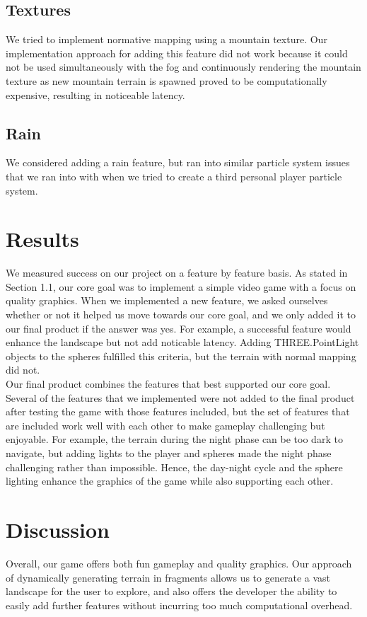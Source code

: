 \documentclass{article}
\begin{document}
\subsection{Textures}
We tried to implement normative mapping using a mountain texture.  Our implementation approach for adding this feature did not work because it could not be used simultaneously with the fog and continuously rendering the mountain texture as new mountain terrain is spawned proved to be computationally expensive, resulting in noticeable latency.

\subsection{Rain}
We considered adding a rain feature, but ran into similar particle system issues that we ran into with when we tried to create a third personal player particle system.

\section{Results}
We measured success on our project on a feature by feature basis.  As stated in Section 1.1, our core goal was to implement a simple video game with a focus on quality graphics.  When we implemented a new feature, we asked ourselves whether or not it helped us move towards our core goal, and we only added it to our final product if the answer was yes.  For example, a successful feature would enhance the landscape but not add noticable latency. Adding THREE.PointLight objects to the spheres fulfilled this criteria, but the terrain with normal mapping did not.\\

Our final product combines the features that best supported our core goal.  Several of the features that we implemented were not added to the final product after testing the game with those features included, but the set of features that are included work well with each other to make gameplay challenging but enjoyable. For example, the terrain during the night phase can be too dark to navigate, but adding lights to the player and spheres made the night phase challenging rather than impossible.  Hence, the day-night cycle and the sphere lighting enhance the graphics of the game while also supporting each other.

%

\section{Discussion}
Overall, our game offers both fun gameplay and quality graphics. Our approach of dynamically generating terrain in fragments allows us to generate a vast landscape for the user to explore, and also offers the developer the ability to easily add further features without incurring too much computational overhead.
\end{document}
